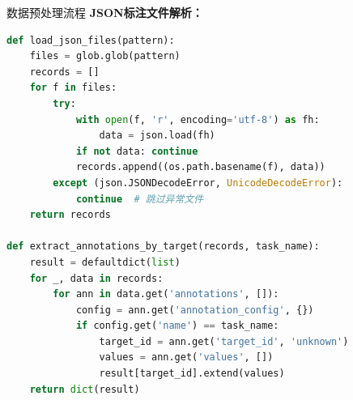 \documentclass[aspectratio=169,xcolor=x11names,compress]{ctexbeamer}
\begin{document}
\begin{frame}[fragile]{数据预处理流程}
\textbf{JSON标注文件解析：}

\vspace{0.3em}
\begin{lstlisting}[language=Python]
def load_json_files(pattern):
    files = glob.glob(pattern)
    records = []
    for f in files:
        try:
            with open(f, 'r', encoding='utf-8') as fh:
                data = json.load(fh)
            if not data: continue
            records.append((os.path.basename(f), data))
        except (json.JSONDecodeError, UnicodeDecodeError):
            continue  # 跳过异常文件
    return records

def extract_annotations_by_target(records, task_name):
    result = defaultdict(list)
    for _, data in records:
        for ann in data.get('annotations', []):
            config = ann.get('annotation_config', {})
            if config.get('name') == task_name:
                target_id = ann.get('target_id', 'unknown')
                values = ann.get('values', [])
                result[target_id].extend(values)
    return dict(result)
\end{lstlisting}
\end{frame}
\end{document}
